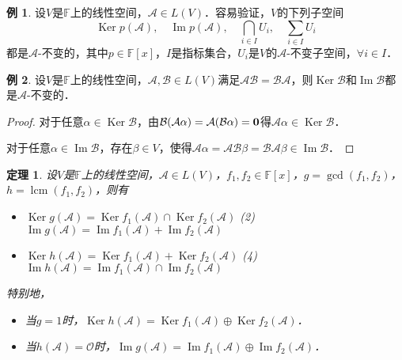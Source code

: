 \documentclass[a4paper,fontset=windows]{ctexbook}
\newtheorem{theorem}{定理}[chapter]
\theoremstyle{definition}
\newtheorem{example}{例}[chapter]
\DeclareMathOperator{\im}{Im}
\DeclareMathOperator{\Ker}{Ker}
\DeclareMathOperator{\lcm}{lcm}
\begin{document}
\begin{example}
设$V$是$\mathbb{F}$上的线性空间，$\mathcal{A}\in L(V)$．容易验证，$V$的下列子空间
$$\Ker p(\mathcal{A}),\quad\im p(\mathcal{A}),\quad\bigcap_{i\in I}U_i,\quad \sum_{i\in I}U_i$$
都是$\mathcal{A}$-不变的，其中$p\in\mathbb{F}[x]$，$I$是指标集合，$U_i$是$V$的$\mathcal{A}$-不变子空间，$\forall i\in I$．
\end{example}

\begin{example}
设$V$是$\mathbb{F}$上的线性空间，$\mathcal{A},\mathcal{B}\in L(V)$满足$\mathcal{AB=BA}$，则$\Ker\mathcal{B}$和$\im\mathcal{B}$都是$\mathcal{A}$-不变的．
\end{example}

\begin{proof}
对于任意$\alpha\in\Ker\mathcal{B}$，由$\mathcal{B}(\mathcal{A}\alpha)=\mathcal{A}(\mathcal{B}\alpha)={\bf 0}$得$\mathcal{A}\alpha\in\Ker\mathcal{B}$．

对于任意$\alpha\in\im\mathcal{B}$，存在$\beta\in V$，使得$\mathcal{A}\alpha=\mathcal{A}\mathcal{B}\beta=\mathcal{B}\mathcal{A}\beta\in\im\mathcal{B}$．
\end{proof}

\begin{theorem}\label{thm9.12}
设$V$是$\mathbb{F}$上的线性空间，$\mathcal{A}\in L(V)$，$f_1,f_2\in\mathbb{F}[x]$，$g=\gcd(f_1,f_2)$，$h=\lcm(f_1,f_2)$，则有
\begin{itemize}
\item[(1)] $\Ker g(\mathcal{A})=\Ker f_1(\mathcal{A})\cap\Ker f_2(\mathcal{A})$ \hspace{32pt}
(2) $\im g(\mathcal{A})=\im f_1(\mathcal{A})+\im f_2(\mathcal{A})$
\item[(3)] $\Ker h(\mathcal{A})=\Ker f_1(\mathcal{A})+\Ker f_2(\mathcal{A})$ \hspace{30pt}
(4) $\im h(\mathcal{A})=\im f_1(\mathcal{A})\cap\im f_2(\mathcal{A})$
\end{itemize}
特别地，
\begin{itemize}
\item[(5)] 当$g=1$时，$\Ker h(\mathcal{A})=\Ker f_1(\mathcal{A})\oplus\Ker f_2(\mathcal{A})$．
\item[(6)] 当$h(\mathcal{A})=\mathcal{O}$时，$\im g(\mathcal{A})=\im f_1(\mathcal{A})\oplus\im f_2(\mathcal{A})$．
\end{itemize}
\end{theorem}
\end{document}
